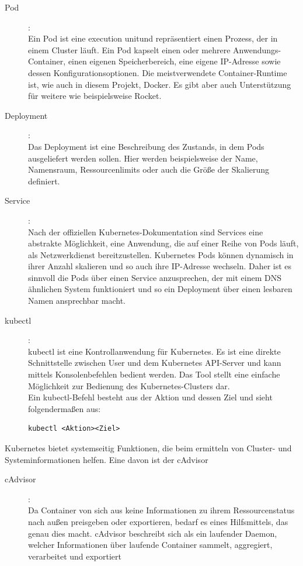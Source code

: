 \documentclass[a4paper,10pt]{scrartcl}
\begin{document}
\begin{description}

\item [Pod]:\\
Ein Pod ist eine \glqq execution unit\grqq und repräsentiert einen Prozess, der in einem Cluster läuft. Ein Pod kapselt einen oder mehrere Anwendungs-Container, einen eigenen Speicherbereich, eine eigene IP-Adresse sowie dessen Konfigurationsoptionen.
Die meistverwendete Container-Runtime ist, wie auch in diesem Projekt, Docker. Es gibt aber auch Unterstützung für weitere wie beispielsweise Rocket.\\
\item [Deployment]:\\
Das Deployment ist eine Beschreibung des Zustands, in dem Pods ausgeliefert werden sollen. Hier werden beispielsweise der Name, Namensraum, Ressourcenlimits oder auch die Größe der Skalierung definiert.
\item [Service]:\\
Nach der offiziellen Kubernetes-Dokumentation sind Services eine \glqq abstrakte Möglichkeit, eine Anwendung, die auf einer Reihe von Pods läuft, als Netzwerkdienst bereitzustellen\grqq. \cite{.30.05.2020b}
Kubernetes Pods können dynamisch in ihrer Anzahl skalieren und so auch ihre IP-Adresse wechseln. Daher ist es sinnvoll die Pods über einen Service anzusprechen, der mit einem DNS ähnlichen System funktioniert und so ein Deployment über einen lesbaren Namen ansprechbar macht. 
\item [kubectl]:\\
kubectl ist eine Kontrollanwendung für Kubernetes. Es ist eine direkte Schnittstelle zwischen User und dem Kubernetes API-Server und kann mittels Konsolenbefehlen bedient werden. Das Tool stellt eine einfache Möglichkeit zur Bedienung des Kubernetes-Clusters dar. \\
Ein kubectl-Befehl besteht aus der Aktion und dessen Ziel und sieht folgendermaßen aus:
\begin{lstlisting}
kubectl <Aktion><Ziel>
\end{lstlisting}
\cite{.24.05.2020}
\end{description}

Kubernetes bietet systemseitig Funktionen, die beim ermitteln von Cluster- und Systeminformationen helfen. Eine davon ist der cAdvisor
 
\begin{description} 
\item [cAdvisor]:\\
Da Container von sich aus keine Informationen zu ihrem Ressourcenstatus nach außen preisgeben oder exportieren, bedarf es eines Hilfsmittels, das genau dies macht.
cAdvisor beschreibt sich als \glqq ein laufender Daemon, welcher Informationen über laufende Container sammelt, aggregiert, verarbeitet und exportiert\grqq
\cite{GithubUser:dashpole.05.07.2020}

\end{description}
\end{document}

